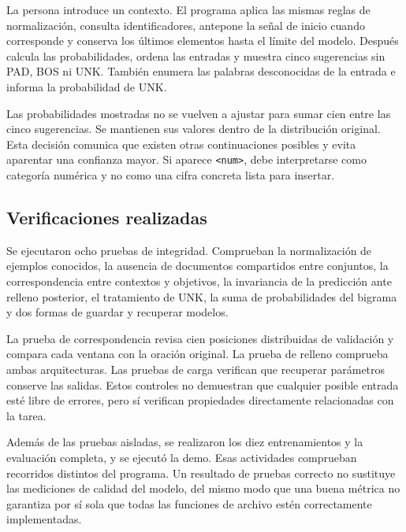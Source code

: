 La persona introduce un contexto. El programa aplica las mismas reglas de normalización, consulta identificadores, antepone la señal de inicio cuando corresponde y conserva los últimos elementos hasta el límite del modelo. Después calcula las probabilidades, ordena las entradas y muestra cinco sugerencias sin PAD, BOS ni UNK. También enumera las palabras desconocidas de la entrada e informa la probabilidad de UNK.

Las probabilidades mostradas no se vuelven a ajustar para sumar cien entre las cinco sugerencias. Se mantienen sus valores dentro de la distribución original. Esta decisión comunica que existen otras continuaciones posibles y evita aparentar una confianza mayor. Si aparece \texttt{<num>}, debe interpretarse como categoría numérica y no como una cifra concreta lista para insertar.

\subsection{Verificaciones realizadas}
Se ejecutaron ocho pruebas de integridad. Comprueban la normalización de ejemplos conocidos, la ausencia de documentos compartidos entre conjuntos, la correspondencia entre contextos y objetivos, la invariancia de la predicción ante relleno posterior, el tratamiento de UNK, la suma de probabilidades del bigrama y dos formas de guardar y recuperar modelos.

La prueba de correspondencia revisa cien posiciones distribuidas de validación y compara cada ventana con la oración original. La prueba de relleno comprueba ambas arquitecturas. Las pruebas de carga verifican que recuperar parámetros conserve las salidas. Estos controles no demuestran que cualquier posible entrada esté libre de errores, pero sí verifican propiedades directamente relacionadas con la tarea.

Además de las pruebas aisladas, se realizaron los diez entrenamientos y la evaluación completa, y se ejecutó la demo. Esas actividades comprueban recorridos distintos del programa. Un resultado de pruebas correcto no sustituye las mediciones de calidad del modelo, del mismo modo que una buena métrica no garantiza por sí sola que todas las funciones de archivo estén correctamente implementadas.
